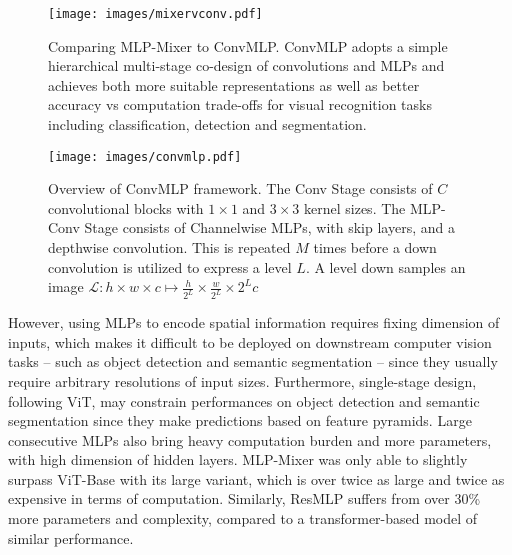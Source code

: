 \documentclass[final]{cvpr}
\begin{document}
\begin{figure}[htb]
\centering
\texttt{[image: images/mixervconv.pdf]}
\caption{Comparing MLP-Mixer to ConvMLP. ConvMLP adopts a simple hierarchical multi-stage co-design of convolutions and MLPs and achieves both more suitable representations as well as better accuracy vs computation trade-offs for visual recognition tasks including classification, detection and segmentation.}
\label{fig:mixerconvmlp}
\end{figure}

\begin{figure*}[htb]
\centering
\texttt{[image: images/convmlp.pdf]}
\caption{Overview of ConvMLP framework. The Conv Stage consists of $C$ convolutional blocks with $1\times1$ and $3\times3$ kernel sizes. The MLP-Conv Stage consists of Channelwise MLPs, with skip layers, and a depthwise convolution. This is repeated $M$ times before a down convolution is utilized to express a level $L$. A level down samples an image $\mathcal{L}:h\times w\times c \mapsto \frac{h}{2^L}\times\frac{w}{2^L}\times2^L c$}
\label{fig:overview}
\end{figure*}

However, using MLPs to encode spatial information requires fixing dimension of inputs, which makes it difficult to be deployed on downstream computer vision tasks -- such as object detection and semantic segmentation -- since they usually require arbitrary resolutions of input sizes. 
Furthermore, single-stage design, following ViT, may constrain performances on object detection and semantic segmentation since they make predictions based on feature pyramids. 
Large consecutive MLPs also bring heavy computation burden and more parameters, with high dimension of hidden layers. MLP-Mixer was only able to slightly surpass ViT-Base with its large variant, which is over twice as large and twice as expensive in terms of computation. Similarly, ResMLP suffers from over 30\% more parameters and complexity, compared to a transformer-based model of similar performance.
\end{document}
